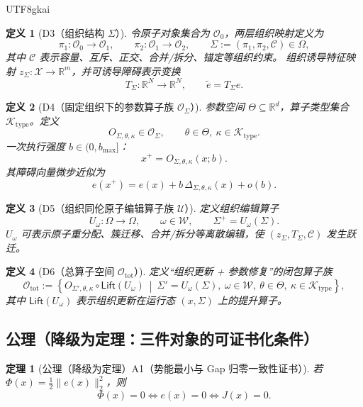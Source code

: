 \documentclass[12pt]{article}
\newtheorem{definition}{定义}[section]
\newtheorem{theorem}{定理}[section]
\newcommand{\RR}{\mathbb{R}}
\begin{document}
\begin{CJK*}{UTF8}{gkai}
\begin{definition}[D3（组织结构 $\Sigma$）]
\label{def:tex28-ch15-d3}
令原子对象集合为 $\mathcal O_0$，两层组织映射定义为
\[
  \pi_1:\mathcal O_0\to\mathcal O_1,\qquad
  \pi_2:\mathcal O_1\to\mathcal O_2,\qquad
  \Sigma:=(\pi_1,\pi_2,\mathcal C)\in\Omega,
\]
其中 $\mathcal C$ 表示容量、互斥、正交、合并/拆分、锚定等组织约束。
组织诱导特征映射 $z_\Sigma:\mathcal X\to\RR^m$，并可诱导障碍表示变换
\[
  T_\Sigma:\RR^N\to\RR^N,\qquad \tilde e=T_\Sigma e.
\]
\end{definition}

\begin{definition}[D4（固定组织下的参数算子族 $\mathcal O_\Sigma$）]
\label{def:tex28-ch15-d4}
参数空间 $\Theta\subseteq\RR^d$，算子类型集合 $\mathcal K_{\mathrm{type}}$。定义
\[
  O_{\Sigma,\theta,\kappa}\in\mathcal O_\Sigma,
  \qquad
  \theta\in\Theta,\ \kappa\in\mathcal K_{\mathrm{type}}.
\]
一次执行强度 $b\in(0,b_{\max}]$：
\[
  x^+=O_{\Sigma,\theta,\kappa}(x;b).
\]
其障碍向量微步近似为
\[
  e(x^+)=e(x)+b\,\Delta_{\Sigma,\theta,\kappa}(x)+o(b).
\]
\end{definition}

\begin{definition}[D5（组织同伦原子编辑算子族 $\mathcal U$）]
\label{def:tex28-ch15-d5}
定义组织编辑算子
\[
  U_\omega:\Omega\to\Omega,\qquad \omega\in\mathcal W,\qquad \Sigma^+=U_\omega(\Sigma).
\]
$U_\omega$ 可表示原子重分配、簇迁移、合并/拆分等离散编辑，使
$(z_\Sigma,T_\Sigma,\mathcal C)$ 发生跃迁。
\end{definition}

\begin{definition}[D6（总算子空间 $\mathcal O_{\mathrm{tot}}$）]
\label{def:tex28-ch15-d6}
定义“组织更新 + 参数修复”的闭包算子族
\[
  \mathcal O_{\mathrm{tot}}
  :=
  \left\{
    O_{\Sigma',\theta,\kappa}\circ \mathsf{Lift}(U_\omega)
    \ \middle|\
    \Sigma'=U_\omega(\Sigma),\ \omega\in\mathcal W,\ \theta\in\Theta,\ \kappa\in\mathcal K_{\mathrm{type}}
  \right\},
\]
其中 $\mathsf{Lift}(U_\omega)$ 表示组织更新在运行态 $(x,\Sigma)$ 上的提升算子。
\end{definition}

\subsection{公理（降级为定理：三件对象的可证书化条件）}
\label{subsec:tex28-ch15-axioms}

\begin{theorem}[公理（降级为定理）A1（势能最小与 Gap 归零一致性证书）]
\label{thm:tex28-ch15-a1}
若 $\Phi(x)=\frac12\|e(x)\|_2^2$，则
\[
  \Phi(x)=0
  \Longleftrightarrow
  e(x)=0
  \Longleftrightarrow
  J(x)=0.
\]
\end{theorem}


\end{CJK*}
\end{document}
